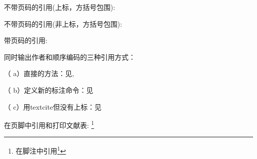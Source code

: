 \documentclass{article}
\begin{document}
 不带页码的引用(上标，方括号包围):
 \cite{Peebles2001-100-100}
 \supercite{Peebles2001-100-100}\par
 不带页码的引用(非上标，方括号包围):
 \parencite{Miroslav2004--}\par
 带页码的引用:
 \cite[见][49页]{蔡敏2006--} \parencite[见][49页]{Miroslav2004--}
 \par
 同时输出作者和顺序编码的三种引用方式：\par
 （ a）直接的方法：见\citeauthor{蔡敏2006--}\cite{蔡敏2006--}, \citeauthor{Miroslav2004--}\cite{Miroslav2004--}\par
 （ b）定义新的标注命令：见\par
 （ c）用textcite但没有上标：见\textcite{蔡敏2006--,Miroslav2004--}\par
 在页脚中引用和打印文献表:
 \footnote{在脚注中引用\footcite{赵学功2001--}} 

\noindent{}


\end{document}
